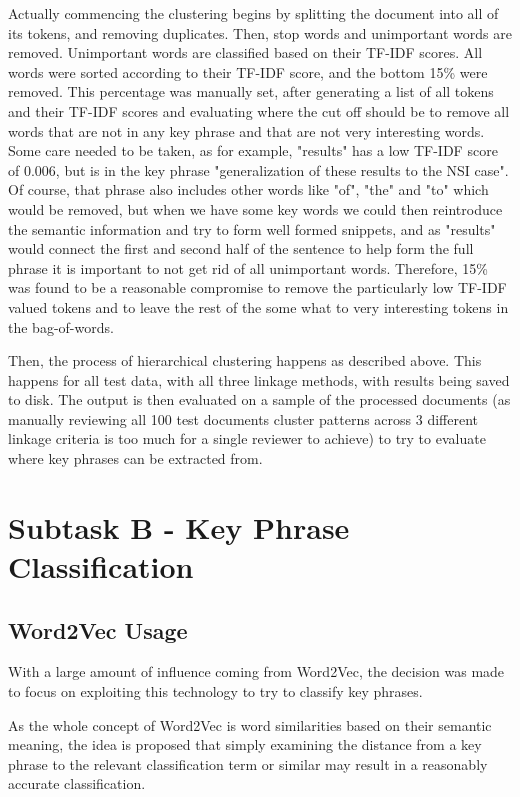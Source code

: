 Actually commencing the clustering begins by splitting the document into all of its tokens, and removing duplicates. Then, stop words and unimportant words are removed. Unimportant words are classified based on their TF-IDF scores. All words were sorted according to their TF-IDF score, and the bottom 15\% were removed. This percentage was manually set, after generating a list of all tokens and their TF-IDF scores and evaluating where the cut off should be to remove all words that are not in any key phrase and that are not very interesting words. Some care needed to be taken, as for example, "results" has a low TF-IDF score of 0.006, but is in the key phrase "generalization of these results to the NSI case". Of course, that phrase also includes other words like "of", "the" and "to" which would be removed, but when we have some key words we could then reintroduce the semantic information and try to form well formed snippets, and as "results" would connect the first and second half of the sentence to help form the full phrase it is important to not get rid of all unimportant words. Therefore, 15\% was found to be a reasonable compromise to remove the particularly low TF-IDF valued tokens and to leave the rest of the some what to very interesting tokens in the bag-of-words.

Then, the process of hierarchical clustering happens as described above. This happens for all test data, with all three linkage methods, with results being saved to disk. The output is then evaluated on a sample of the processed documents (as manually reviewing all 100 test documents cluster patterns across 3 different linkage criteria is too much for a single reviewer to achieve) to try to evaluate where key phrases can be extracted from.

\section{Subtask B - Key Phrase Classification}
\subsection{Word2Vec Usage}
With a large amount of influence coming from Word2Vec, the decision was made to focus on exploiting this technology to try to classify key phrases.

As the whole concept of Word2Vec is word similarities based on their semantic meaning, the idea is proposed that simply examining the distance from a key phrase to the relevant classification term or similar may result in a reasonably accurate classification. 

